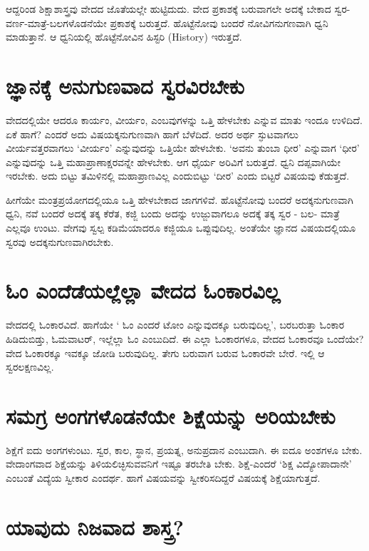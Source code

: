 ಆದ್ದರಿಂಡ ಶಿಕ್ಷಾಶಾಸ್ತ್ರವು ವೇದದ ಜೊತೆಯಲ್ಲೇ ಹುಟ್ಟಿದುದು. ವೇದ ಪ್ರಕಾಶಕ್ಕೆ  ಬರುವಾಗಲೇ ಅದಕ್ಕೆ ಬೇಕಾದ ಸ್ವರ-ವರ್ಣ-ಮಾತ್ರೆ-ಬಲಗಳೊಡನೆಯೇ ಪ್ರಕಾಶಕ್ಕೆ ಬರುತ್ತದೆ. ಹೊಟ್ಟೆನೋವು ಬಂದರೆ ನೋವಿಗನುಗಣವಾಗಿ ಧ್ವನಿ ಮಾಡುತ್ತಾನೆ. ಆ ಧ್ವನಿಯಲ್ಲಿ ಹೊಟ್ಟೆನೋವಿನ ಹಿಸ್ಟರಿ {(\eng History)} ಇರುತ್ತದೆ.

\section*{ಜ್ಞಾನಕ್ಕೆ ಅನುಗುಣವಾದ ಸ್ವರವಿರಬೇಕು}

ವೇದದಲ್ಲಿಯೇ ಆದರೂ ಕಾರ್ಯಂ, ವೀರ್ಯಂ, ಎಂಬವುಗಳನ್ನು ಒತ್ತಿ ಹೇಳಬೇಕು ಎನ್ನುವ ಮಾತು ಇಂದೂ ಉಳಿದಿದೆ. ಏಕೆ ಹಾಗೆ? ಎಂದರೆ ಅದು ವಿಷಯಕ್ಕನುಗುಣವಾಗಿ ಹಾಗೆ ಬೆಳೆದಿದೆ. ಅದರ ಅರ್ಥ ಸ್ಫುಟವಾಗಲು ವೀರ್ಯವತ್ತರವಾಗಲು `ವೀರ್ಯಂ' ಎನ್ನುವುದನ್ನು  ಒತ್ತಿಯೇ ಹೇಳಬೇಕು. `ಅವನು ತುಂಬಾ ಧೀರ' ಎನ್ನುವಾಗ `ಧೀರ' ಎನ್ನುವುದನ್ನು ಒತ್ತಿ ಮಹಾಪ್ರಾಣಾಕ್ಷರವನ್ನೇ ಹೇಳಬೇಕು. ಆಗ ಧೈರ್ಯ ಅರಿವಿಗೆ ಬರುತ್ತದೆ. ಧ್ವನಿ ದಪ್ಪವಾಗಿಯೇ ಇರಬೇಕು. ಅದು ಬಿಟ್ಟು ತಮಿಳಿನಲ್ಲಿ ಮಹಾಪ್ರಾಣವಿಲ್ಲ ಎಂದುಬಿಟ್ಟು `ದೀರ' ಎಂದು ಬಿಟ್ಟರೆ ವಿಷಯವು ಕೆಡುತ್ತದೆ.

ಹೀಗೆಯೇ ಮಂತ್ರಪ್ರಯೋಗದಲ್ಲಿಯೂ ಒತ್ತಿ ಹೇಳಬೇಕಾದ ಜಾಗಗಳಿವೆ. ಹೊಟ್ಟೆನೋವು ಬಂದರೆ ಅದಕ್ಕನುಗುಣವಾಗಿ ಧ್ವನಿ, ನವೆ ಬಂದರೆ ಅದಕ್ಕೆ ತಕ್ಕ ಕೆರೆತ, ಕಜ್ಜಿ  ಬಂದು ಅದನ್ನು ಉಜ್ಜುವಾಗಲೂ ಅದಕ್ಕೆ ತಕ್ಕ ಸ್ವರ - ಬಲ- ಮಾತ್ರೆ ಎಲ್ಲವೂ ಉಂಟು. ವೇಗವು ಸ್ವಲ್ಪ ಕಡಿಮೆಯಾದರೂ ಕಜ್ಜಿಯೂ ಒಪ್ಪುವುದಿಲ್ಲ. ಅಂತೆಯೇ ಜ್ಞಾನದ ವಿಷಯದಲ್ಲಿಯೂ ಸ್ವರವು ಅದಕ್ಕನುಗುಣವಾಗಿರಬೇಕು.

\section*{ಓಂ ಎಂದೆಡೆಯಲ್ಲೆಲ್ಲಾ ವೇದದ ಓಂಕಾರವಿಲ್ಲ}

ವೇದದಲ್ಲಿ ಓಂಕಾರವಿದೆ. ಹಾಗೆಯೇ ` ಓಂ ಎಂದರೆ ಟೋಂ ಎನ್ನುವುದಕ್ಕೂ ಬರುವುದಿಲ್ಲ', ಬರಬರುತ್ತಾ ಓಂಕಾರ ಹಿಡಿದುಬಿಡ್ತು, ಓಮವಾಟರ್, ಇಲ್ಲೆಲ್ಲಾ ಓಂ ಎಂಬುದಿದೆ. ಈ ಎಲ್ಲಾ ಓಂಕಾರಗಳೂ, ವೇದದ ಓಂಕಾರವೂ ಒಂದೆಯೇ? ವೇದ ಓಂಕಾರಕ್ಕೂ ಇವಕ್ಕೂ ಜೋಡಿ ಬರುವುದಿಲ್ಲ. ತೇಗು ಬರುವಾಗ ಬರುವ ಓಂಕಾರವೇ ಬೇರೆ. ಇಲ್ಲಿ ಆ ಸ್ವರಲಕ್ಷಣವಿಲ್ಲ.

\section*{ಸಮಗ್ರ ಅಂಗಗಳೊಡನೆಯೇ ಶಿಕ್ಷೆಯನ್ನು ಅರಿಯಬೇಕು}

ಶಿಕ್ಷೆಗೆ ಐದು ಅಂಗಗಳುಂಟು. ಸ್ವರ, ಕಾಲ, ಸ್ಥಾನ, ಪ್ರಯತ್ನ, ಅನುಪ್ರದಾನ ಎಂಬುದಾಗಿ. ಈ ಐದೂ ಅಂಶಗಳೂ ಬೇಕು. ವೇದಾಂಗವಾದ ಶಿಕ್ಷೆಯನ್ನು ತಿಳಿಯಲಿಚ್ಛಿಸುವವನಿಗೆ ಇಷ್ಟೂ ತರಬೇತಿ ಬೇಕು. ಶಿಕ್ಷೆ-ಎಂದರೆ `ಶಿಕ್ಷ ವಿದ್ಯೋಪಾದಾನೇ' ಎಂಬಂತೆ ವಿದ್ಯೆಯ ಸ್ವೀಕಾರ ಎಂದರ್ಥ. ಹಾಗೆ ವಿಷಯವನ್ನು ಸ್ವೀಕರಿಸದಿದ್ದರೆ ವಿಷಯಕ್ಕೆ ಶಿಕ್ಷೆಯಾಗುತ್ತದೆ.

\section*{ಯಾವುದು ನಿಜವಾದ ಶಾಸ್ತ್ರ?}

